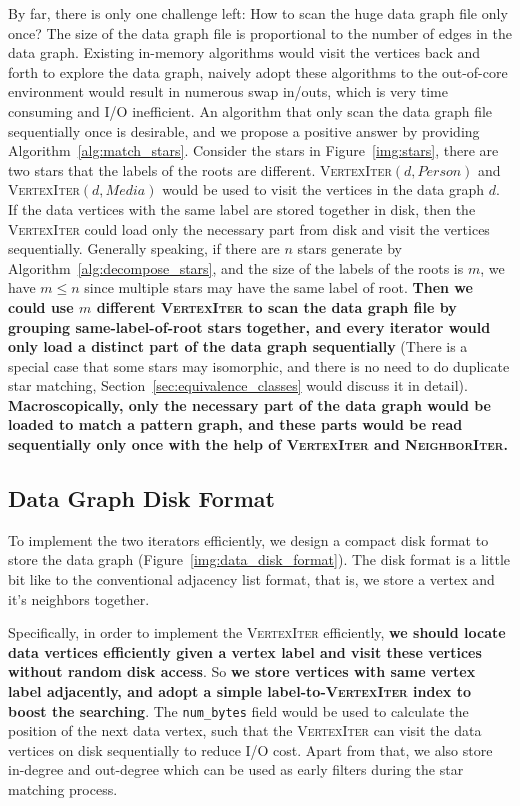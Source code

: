By far, there is only one challenge left: How to scan the huge data graph file only once?
The size of the data graph file is proportional to the number of edges in the data graph.
Existing in-memory algorithms would visit the vertices back and forth to explore the data graph,
naively adopt these algorithms to the out-of-core environment would result in numerous swap in/outs,
which is very time consuming and I/O inefficient.
An algorithm that only scan the data graph file sequentially once is desirable,
and we propose a positive answer by providing Algorithm~\ref{alg:match_stars}.
Consider the stars in Figure~\ref{img:stars}, there are two stars that the labels of the roots are different.
\textsc{VertexIter}$(d, Person)$ and \textsc{VertexIter}$(d, Media)$ would be used to visit the vertices in the data graph $d$.
If the data vertices with the same label are stored together in disk,
then the \textsc{VertexIter} could load only the necessary part from disk and visit the vertices sequentially.
Generally speaking, if there are $n$ stars generate by Algorithm~\ref{alg:decompose_stars},
and the size of the labels of the roots is $m$, we have $m \le n$ since multiple stars may have the same label of root.
\textbf{Then we could use $m$ different \textsc{VertexIter} to scan the data graph file by grouping same-label-of-root stars together,
and every iterator would only load a distinct part of the data graph sequentially}
(There is a special case that some stars may isomorphic,
and there is no need to do duplicate star matching, Section~\ref{sec:equivalence_classes} would discuss it in detail).
\textbf{Macroscopically, only the necessary part of the data graph would be loaded to match a pattern graph,
and these parts would be read sequentially only once with the help of \textsc{VertexIter} and \textsc{NeighborIter}.}
\subsection*{Data Graph Disk Format}
To implement the two iterators efficiently, we design a compact disk format to store the data graph (Figure~\ref{img:data_disk_format}).
The disk format is a little bit like to the conventional adjacency list format,
that is, we store a vertex and it's neighbors together.

Specifically, in order to implement the \textsc{VertexIter} efficiently,
\textbf{we should locate data vertices efficiently given a vertex label and visit these vertices without random disk access}.
So \textbf{we store vertices with same vertex label adjacently, and adopt a simple label-to-\textsc{VertexIter} index to boost the searching}.
The \texttt{num_bytes} field would be used to calculate the position of the next data vertex,
such that the \textsc{VertexIter} can visit the data vertices on disk sequentially to reduce I/O cost.
Apart from that, we also store in-degree and out-degree which can be used as early filters during the star matching process.

